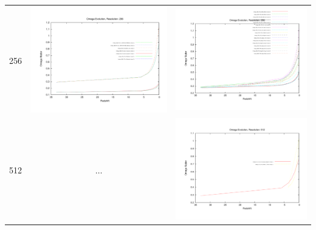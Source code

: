 \documentclass[a4paper,11pt,fleqn,oneside]{book}
\begin{document}
\begin{itemize}
\begin{table}
\begin{tabular}{l|c|c}
 256 & \includegraphics[scale=0.2]{analysis/omega_evolution/omega_evolution_256_h70.pdf} & \includegraphics[scale=0.2]{analysis/omega_evolution/omega_evolution_256_h100.pdf} \\
 512 & $\dots$ & \includegraphics[scale=0.2]{analysis/omega_evolution/omega_evolution_512_h100.pdf} \\


\end{tabular}
\end{table}
\end{itemize}
\end{document}
